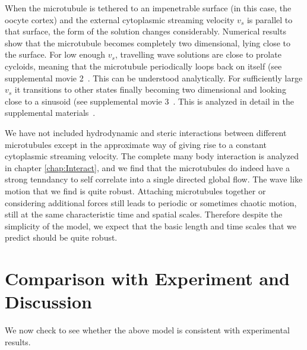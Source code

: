 \documentclass[11pt]{ucthesis}
\begin{document}
{When the microtubule is tethered to an impenetrable surface (in this case, the oocyte cortex) and the external cytoplasmic streaming velocity $v_s$
is parallel to that surface, the form of the solution changes considerably. Numerical results show that the microtubule becomes completely two dimensional,
lying close to the surface. For low enough $v_s$, travelling wave
solutions are close to prolate cycloids, meaning that the microtubule periodically loops back
on itself (see supplemental movie 2~\cite{SupplMovies}. This can be understood analytically. For sufficiently large $v_s$ it transitions to other states finally becoming 
two dimensional and looking close to a sinusoid (see supplemental movie 3~\cite{SupplMovies}. This is analyzed in detail in
the supplemental materials~\cite{SupplMat}.

We have not included hydrodynamic and steric interactions between
different microtubules except in the approximate way of giving rise to
a constant cytoplasmic streaming velocity. 
The complete many body interaction is analyzed in chapter \ref{chap:Interact}, and we find that the microtubules do indeed have a strong tenndancy to self correlate into a single directed global flow. 
The wave like motion that we find is quite robust. Attaching microtubules together or
considering additional forces still leads to periodic or sometimes chaotic
motion, still at the same characteristic time and spatial scales. Therefore
despite the simplicity of the model, we expect that the basic length
and time scales that we predict should be quite robust.

\section{Comparison with Experiment and Discussion}

We now check to see whether the above model is consistent with experimental
results.  

}
\end{document}
